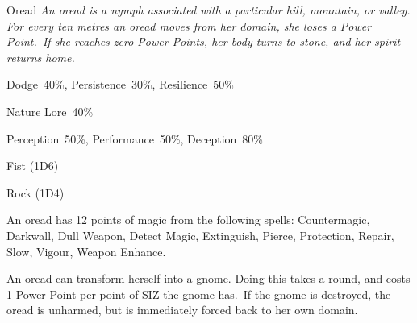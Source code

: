 \begin{monsterbox}{Oread}
	\textit{An oread is a nymph associated with a particular hill, mountain, or valley. For every ten metres an oread moves from her domain, she loses a Power Point. If she reaches zero Power Points, her body turns to stone, and her spirit returns home.}\\
	\rpghline
	\basics[%
        hitpoints  = 11, 
	majorwound = 6,
	damagemodifier = 0,
	powerpoints = 25,
	movementrate = 15m,
	armor = None,
	plunderrating = 1
	]
	\rpghline%
	\stats[ %
		STR = 2D6    (7),
		CON = 3D6+3  (12),
		DEX = 3D6+6  (17),
		SIZ = 2D6+3  (10),
		INT = 3D6+3  (14),
		POW = 2D6+15 (22),
		CHA = 2D6+9  (15)
	]
	\rpghline%
	\begin{rpg-monsteraction}[Resistances]
		Dodge~40\%, Persistence~30\%, Resilience~50\%
	\end{rpg-monsteraction}
	\begin{rpg-monsteraction}[Knowledge]
		Nature Lore~40\%
	\end{rpg-monsteraction}
	\begin{rpg-monsteraction}[Practical]
		Perception~50\%, Performance~50\%, Deception~80\%
	\end{rpg-monsteraction}
	\begin{rpg-monsteraction}
		Fist (1D6)
	\end{rpg-monsteraction}
	\begin{rpg-monsteraction}
		Rock (1D4)
	\end{rpg-monsteraction}
	\begin{rpg-monsteraction}[Magic 70\%]
		An oread has 12 points of magic from the following spells: Countermagic, Darkwall, Dull Weapon, Detect Magic, Extinguish, Pierce, Protection, Repair, Slow, Vigour, Weapon Enhance.
	\end{rpg-monsteraction}
	\begin{rpg-monsteraction}
		An oread can transform herself into a gnome. Doing this takes a round, and costs 1 Power Point per point of SIZ the gnome has. If the gnome is destroyed, the oread is unharmed, but is immediately forced back to her own domain.
	\end{rpg-monsteraction}

\end{monsterbox}


